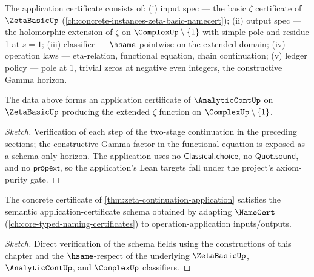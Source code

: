 \begin{definition}
\label{def:zeta-cont-app-cert}
The application certificate consists of: (i) input spec --- the basic \(\zeta\) certificate of \(\ZetaBasicUp\) (\autoref{ch:concrete-instances-zeta-basic-namecert}); (ii) output spec --- the holomorphic extension of \(\zeta\) on \(\ComplexUp \setminus \{1\}\) with simple pole and residue 1 at \(s = 1\); (iii) classifier --- \(\hsame\) pointwise on the extended domain; (iv) operation laws --- eta-relation, functional equation, chain continuation; (v) ledger policy --- pole at 1, trivial zeros at negative even integers, the constructive Gamma horizon.
\end{definition}

\begin{theorem}
\label{thm:zeta-continuation-application}
The data above forms an application certificate of \(\AnalyticContUp\) on \(\ZetaBasicUp\) producing the extended \(\zeta\) function on \(\ComplexUp \setminus \{1\}\).
\end{theorem}
\begin{proof}[Sketch]
Verification of each step of the two-stage continuation in the preceding sections; the constructive-Gamma factor in the functional equation is exposed as a schema-only horizon. The application uses no \(\mathsf{Classical.choice}\), no \(\mathsf{Quot.sound}\), and no \(\mathsf{propext}\), so the application's Lean targets fall under the project's axiom-purity gate.
\end{proof}

\begin{theorem}
\label{thm:zeta-continuation-semantic}
The concrete certificate of \autoref{thm:zeta-continuation-application} satisfies the semantic application-certificate schema obtained by adapting \(\NameCert\) (\autoref{ch:core-typed-naming-certificates}) to operation-application inputs/outputs.
\end{theorem}
\begin{proof}[Sketch]
Direct verification of the schema fields using the constructions of this chapter and the \(\hsame\)-respect of the underlying \(\ZetaBasicUp\), \(\AnalyticContUp\), and \(\ComplexUp\) classifiers.
\end{proof}
